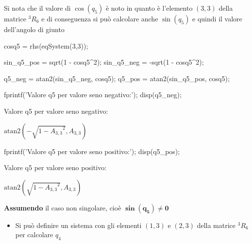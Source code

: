 \documentclass[11pt, a4paper]{article}
\begin{document}
\begin{par}
\begin{flushleft}
Si nota che il valore di $\cos (q_5 )$ è noto in quanto è l'elemento $(3,3)$ della matrice $^3 R_6$ e di conseguenza si può calcolare anche $\sin (q_5 )$ e quindi il valore dell'angolo di giunto
\end{flushleft}
\end{par}

\begin{matlabcode}
cosq5 = rhs(eqSystem(3,3));

sin_q5_pos = sqrt(1 - cosq5^2);
sin_q5_neg = -sqrt(1 - cosq5^2);

q5_neg = atan2(sin_q5_neg, cosq5);
q5_pos = atan2(sin_q5_pos, cosq5);

fprintf('Valore q5 per valore seno negativo:');
disp(q5_neg);
\end{matlabcode}
\begin{matlaboutput}
Valore q5 per valore seno negativo:
\end{matlaboutput}
\begin{matlabsymbolicoutput}
$\displaystyle \textrm{atan2}\left(-\sqrt{1-{A_{3,3} }^2 },A_{3,3} \right)$
\end{matlabsymbolicoutput}
\begin{matlabcode}
fprintf('Valore q5 per valore seno positivo:');
disp(q5_pos);
\end{matlabcode}
\begin{matlaboutput}
Valore q5 per valore seno positivo:
\end{matlaboutput}
\begin{matlabsymbolicoutput}
$\displaystyle \textrm{atan2}\left(\sqrt{1-{A_{3,3} }^2 },A_{3,3} \right)$
\end{matlabsymbolicoutput}
\newpage
\begin{par}
\begin{flushleft}
\textbf{Assumendo} il caso non singolare, cioè $\boldsymbol{\sin(q_5) \neq 0}$
\end{flushleft}
\end{par}

\begin{itemize}

   \item{\begin{flushleft} Si può definire un sistema con gli elementi $(1,3)$ e $(2,3)$ della matrice $^3 R_6$ per calcolare $q_4$ \end{flushleft}}
\end{itemize}
\end{document}
